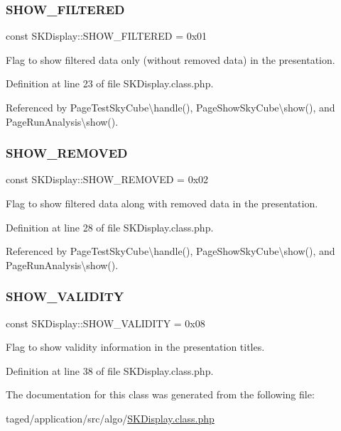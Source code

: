 \subsubsection{\texorpdfstring{S\+H\+O\+W\+\_\+\+F\+I\+L\+T\+E\+R\+ED}{SHOW\_FILTERED}}
{\footnotesize\ttfamily const S\+K\+Display\+::\+S\+H\+O\+W\+\_\+\+F\+I\+L\+T\+E\+R\+ED = 0x01}

Flag to show filtered data only (without removed data) in the presentation. 

Definition at line 23 of file S\+K\+Display.\+class.\+php.



Referenced by Page\+Test\+Sky\+Cube\textbackslash{}handle(), Page\+Show\+Sky\+Cube\textbackslash{}show(), and Page\+Run\+Analysis\textbackslash{}show().

\mbox{\label{class_s_k_display_a0c636ff1c2464c600850d5d28e10df32}} 
\subsubsection{\texorpdfstring{S\+H\+O\+W\+\_\+\+R\+E\+M\+O\+V\+ED}{SHOW\_REMOVED}}
{\footnotesize\ttfamily const S\+K\+Display\+::\+S\+H\+O\+W\+\_\+\+R\+E\+M\+O\+V\+ED = 0x02}

Flag to show filtered data along with removed data in the presentation. 

Definition at line 28 of file S\+K\+Display.\+class.\+php.



Referenced by Page\+Test\+Sky\+Cube\textbackslash{}handle(), Page\+Show\+Sky\+Cube\textbackslash{}show(), and Page\+Run\+Analysis\textbackslash{}show().

\mbox{\label{class_s_k_display_a0cf8f3d0a6775fa219d9c8fc5ba84912}} 
\subsubsection{\texorpdfstring{S\+H\+O\+W\+\_\+\+V\+A\+L\+I\+D\+I\+TY}{SHOW\_VALIDITY}}
{\footnotesize\ttfamily const S\+K\+Display\+::\+S\+H\+O\+W\+\_\+\+V\+A\+L\+I\+D\+I\+TY = 0x08}

Flag to show validity information in the presentation titles. 

Definition at line 38 of file S\+K\+Display.\+class.\+php.



The documentation for this class was generated from the following file\+:\begin{DoxyCompactItemize}
\item 
taged/application/src/algo/\hyperlink{_s_k_display_8class_8php}{S\+K\+Display.\+class.\+php}\end{DoxyCompactItemize}

